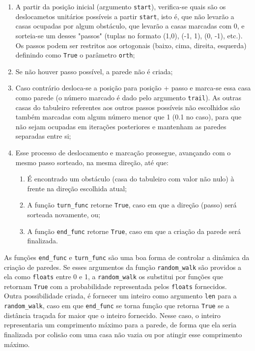 \documentclass{article}
\begin{document}
\begin{enumerate}
	\item A partir da posição inicial (argumento \verb|start|), verifica-se quais são os deslocametos unitários possíveis a partir \verb|start|, isto é, que não levarão a casas ocupadas por algum obstáculo, que levarão a casas marcadas com 0, e sorteia-se um desses "passos" (tuplas no formato (1,0), (-1, 1), (0, -1), etc.). Os passos podem ser restritos aos ortogonais (baixo, cima, direita, esquerda) definindo como \verb|True| o parâmetro \verb|orth|;
	\item Se não houver passo possível, a parede não é criada;
	\item Caso contrário desloca-se a posição para posição + passo e marca-se essa casa como parede (o número marcado é dado pelo argumento \verb|trail|). As outras casas do tabuleiro referentes aos outros passos possíveis não escolhidos são também marcadas com algum número menor que 1 (0.1 no caso), para que não sejam ocupadas em iterações posteriores e mantenham as paredes separadas entre si;
	\item Esse processo de deslocamento e marcação prossegue, avançando com o mesmo passo sorteado, na mesma direção, até que:
		\begin{enumerate}
			\item É encontrado um obstáculo (casa do tabuleiro com valor não nulo) à frente na direção escolhida atual;
			\item A função \verb|turn_func| retorne \verb|True|, caso em que a direção (passo) será sorteada novamente, ou;
			\item A função \verb|end_func| retorne \verb|True|, caso em que a criação da parede será finalizada.
		\end{enumerate}
\end{enumerate}

As funções \verb|end_func| e \verb|turn_func| são uma boa forma de controlar a dinâmica da criação de paredes. Se esses argumentos da função \verb|random_walk| são providos a ela como \verb|floats| entre 0 e 1, a \verb|random_walk| os substitui por funções que retornam \verb|True| com a probabilidade representada pelos \verb|floats| fornecidos.\\

Outra possibilidade criada, é fornecer um inteiro como argumento \verb|len| para a \verb|random_walk|, caso em que \verb|end_func| se torna função que retorna \verb|True| se a distância traçada for maior que o inteiro fornecido. Nesse caso, o inteiro representaria um comprimento máximo para a parede, de forma que ela seria finalizada por colisão com uma casa não vazia ou por atingir esse comprimento máximo.
\end{document}
